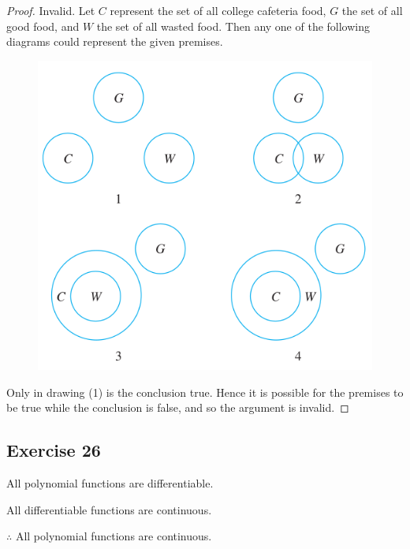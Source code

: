 \documentclass[14pt]{extarticle}
\begin{document}
\begin{proof}
Invalid. Let $C$ represent the set of all college cafeteria food, $G$ the set of all good food, and $W$ the set of all wasted food. Then any one of the following diagrams could represent the given premises.

\begin{figure}[ht!]
\centering
\includegraphics[scale=0.31]{../images/3.4.25.png}
\end{figure}

Only in drawing (1) is the conclusion true. Hence it is possible for the premises to be true while the conclusion is false, and so the argument is invalid.
\end{proof}

\subsection{Exercise 26}
All polynomial functions are differentiable.

All differentiable functions are continuous.

$\therefore$ All polynomial functions are continuous.
\end{document}
